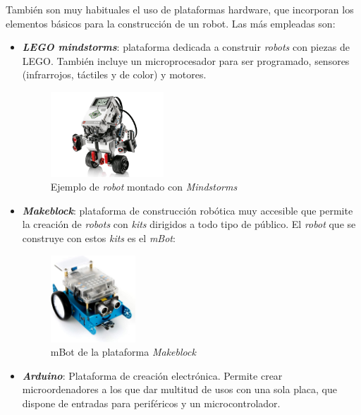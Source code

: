 También son muy habituales el uso de plataformas hardware, que incorporan los elementos básicos para la construcción de un robot. Las más empleadas son: 
\begin{itemize}
    \item \textit{\textbf{LEGO mindstorms}}: plataforma dedicada a construir \textit{robots} con piezas de LEGO. También incluye un microprocesador para ser programado, sensores (infrarrojos, táctiles y de color) y motores.
            \begin{figure}[H]
        \centering
        \includegraphics[width=0.4\textwidth]{img/legomind.jpg}
        \caption{Ejemplo de \textit{robot} montado con \textit{Mindstorms}} \label{fig:lego}
    \end{figure}
    \item \textit{\textbf{Makeblock}}\cite{bib:makeblock}: plataforma de construcción robótica muy accesible que permite la creación de \textit{robots} con \textit{kits} dirigidos a todo tipo de público. El \textit{robot} que se construye con estos \textit{kits} es el \textit{mBot}:
        \begin{figure}[H]
        \centering
        \includegraphics[width=0.3\textwidth]{img/mBotReal.jpg}
        \caption{mBot de la plataforma \textit{Makeblock}} \label{fig:makeblock}
    \end{figure}
    
    \item \textit{\textbf{Arduino}}\cite{bib:arduino}: Plataforma de creación electrónica. Permite crear microordenadores a los que dar multitud de usos con una sola placa, que dispone de entradas para periféricos y un microcontrolador.
    
\end{itemize}{}
